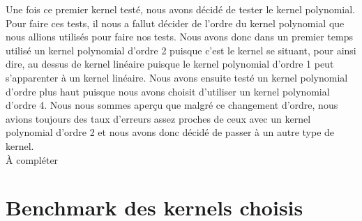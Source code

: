 \documentclass[fontsize=10pt, twoside=no]{scrartcl} %
\begin{document}
Une fois ce premier kernel testé, nous avons décidé de tester le kernel polynomial. Pour faire ces tests, il nous a fallut décider de l'ordre du kernel polynomial que nous allions utilisés pour faire nos tests. Nous avons donc dans un premier temps utilisé un kernel polynomial d'ordre 2 puisque c'est le kernel se situant, pour ainsi dire, au dessus de kernel linéaire puisque le kernel polynomial d'ordre 1 peut s'apparenter à un kernel linéaire. Nous avons ensuite testé un kernel polynomial d'ordre plus haut puisque nous avons choisit d'utiliser un kernel polynomial d'ordre 4. Nous nous sommes aperçu que malgré ce changement d'ordre, nous avions toujours des taux d'erreurs assez proches de ceux avec un kernel polynomial d'ordre 2 et nous avons donc décidé de passer à un autre type de kernel.\\

\`A compléter

\part{Benchmark des kernels choisis}

\\
\end{document}

